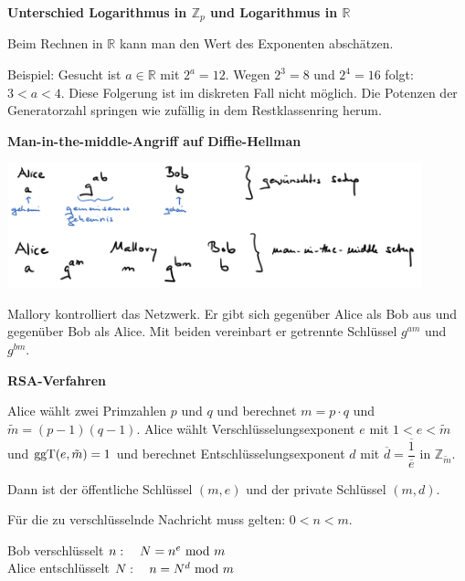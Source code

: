 \begin{frame}[fragile]

\textbf{Unterschied Logarithmus in $\mathbb{Z}_p$ und Logarithmus in $\mathbb{R}$} \pause

Beim Rechnen in $\mathbb{R}$ kann man den Wert des Exponenten abschätzen. \pause

Beispiel: Gesucht ist $a \in \mathbb{R}$ mit $2^a = 12$. \pause Wegen $2^3 = 8$ und $2^4 = 16$ folgt: $3 < a < 4$. \pause
Diese Folgerung ist im diskreten Fall nicht möglich. \pause  Die Potenzen der Generatorzahl springen wie zufällig in dem Restklassenring herum.
\end{frame}


\begin{frame}[fragile]

\textbf{Man-in-the-middle-Angriff auf Diffie-Hellman}

\includegraphics[width=12cm]{bild3.png}

Mallory kontrolliert das Netzwerk. Er gibt sich gegenüber Alice als Bob aus und gegenüber Bob als Alice. Mit beiden vereinbart er getrennte Schlüssel $g^{am}$ und $g^{bm}$.
\end{frame}


\begin{frame}[fragile]

\textbf{RSA-Verfahren} \pause

Alice wählt zwei Primzahlen $p$ und $q$ und berechnet $m = p \cdot q$ und $\tilde{m} = (p-1)(q-1)$. \pause
Alice wählt Verschlüsselungsexponent $e$ mit $1 < e < \tilde{m}$ und $\operatorname{ggT}(e,\tilde{m}) = 1$ \pause und berechnet Entschlüsselungsexponent $d$ mit $\overline{d} = \dfrac{\overline{1}}{\overline{e}}$ in $\mathbb{Z}_{\tilde{m}}$. \pause

Dann ist der öffentliche Schlüssel  $(m,e)$ und der private Schlüssel $(m,d)$. \pause

Für die zu verschlüsselnde Nachricht muss gelten: $0<n<m$. \pause

Bob verschlüsselt $n: \quad N = n^e \text{ mod } m$ \\ \pause
Alice entschlüsselt $N: \quad n = N^d \text{ mod } m$ 
\end{frame}



